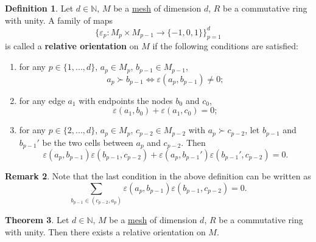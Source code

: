\documentclass[fleqn]{article}
\theoremstyle{definition}
\newtheorem{theorem}{Theorem}[section]
\newtheorem{definition}[theorem]{Definition}
\newtheorem{remark}[theorem]{Remark}
\newcommand{\N}{\mathbb{N}}
\begin{document}
\begin{definition}
  \label{idec:relative_orientation:definition}
  Let
    $d \in \N$,
    $M$ be a \hyperref[idec:mesh:definition]{mesh} of dimension $d$,
    $R$ be a commutative ring with unity.
  A family of maps
  \begin{equation}
    \{\varepsilon_p \colon M_p \times M_{p - 1} \to \{-1, 0, 1\}\}_{p = 1}^d
  \end{equation}
  is called a \textbf{relative orientation}
  on $M$ if the following conditions are satisfied:
  \begin{enumerate}
    \item
      for any $p \in \{1, ..., d\}$, $a_p \in M_p$, $b_{p - 1} \in M_{p - 1}$,
      \begin{equation}
        a_p \succ b_{p - 1} \Leftrightarrow \varepsilon(a_p, b_{p - 1}) \neq 0;
      \end{equation}
    \item
      for any edge $a_1$ with endpoints the nodes $b_0$ and $c_0$,
      \begin{equation}
        \varepsilon(a_1, b_0) + \varepsilon(a_1, c_0) = 0;
      \end{equation}
    \item
      for any
        $p \in \{2, ..., d\}$,
        $a_p \in M_p$,
        $c_{p - 2} \in M_{p - 2}$ with $a_p \succ c_{p - 2}$,
      let $b_{p - 1}$ and $b_{p - 1}'$ be the two
      cells between $a_p$ and $c_{p - 2}$.
      Then
      \begin{equation}
          \varepsilon(a_p, b_{p - 1}) \varepsilon(b_{p - 1}, c_{p - 2}) 
        + \varepsilon(a_p, b_{p - 1}') \varepsilon(b_{p - 1}', c_{p - 2}) = 0.
      \end{equation}
  \end{enumerate}
\end{definition}

\begin{remark}
  Note that the last condition in the above definition can be written as
  \begin{equation}
    \sum _{b_{p - 1} \in (c_{p - 2}, a_p)}
    \varepsilon(a_p, b_{p - 1}) \varepsilon(b_{p - 1}, c_{p - 2}) = 0.
  \end{equation}
\end{remark}

\begin{theorem}
  Let
    $d \in \N$,
    $M$ be a \hyperref[idec:mesh:definition]{mesh} of dimension $d$,
    $R$ be a commutative ring with unity.
  Then there exists a relative orientation on $M$.
\end{theorem}
\end{document}
